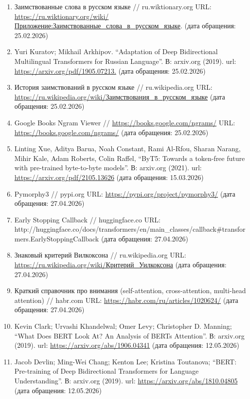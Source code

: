 \begin{enumerate}
\item
  Заимствованные слова в русском языке // ru.wiktionary.org URL: \href{https://ru.wiktionary.org/wiki/Приложение:Заимствованные_слова_в_русском_языке}{https://ru.wiktionary.org/wiki/Приложение:Заимствованные\_слова\_в\_русском\_языке}. (дата обращения: 25.02.2026)
\item
  Yuri Kuratov; Mikhail Arkhipov. ``Adaptation of Deep Bidirectional Multilingual Transformers for Russian Language''. В: arxiv.org (2019). url: \url{https://arxiv.org/pdf/1905.07213.} (дата обращения: 25.02.2026)
\item
  История заимствований в русском языке // ru.wikipedia.org URL: \href{https://ru.wikipedia.org/wiki/Заимствования_в_русском_языке}{https://ru.wikipedia.org/wiki/Заимствования\_в\_русском\_языке} (дата обращения: 25.02.2026)
\item
  Google Books Ngram Viewer // \url{https://books.google.com/ngrams/} URL: \url{https://books.google.com/ngrams/} (дата обращения: 25.02.2026)
\item
  Linting Xue, Aditya Barua, Noah Constant, Rami Al-Rfou, Sharan Narang, Mihir Kale, Adam Roberts, Colin Raffel, ``ByT5: Towards a token-free future with pre-trained byte-to-byte models''. В: arxiv.org (2021). url: \url{https://arxiv.org/pdf/2105.13626} (дата обращения: 15.03.2026)
\item
  Pymorphy3 // pypi.org URL: \url{https://pypi.org/project/pymorphy3/} (дата обращения: 27.04.2026)
\item
  Early Stopping Callback // huggingface.co URL: http://huggingface.co/docs/transformers/en/main\_classes/callback\#transformers.EarlyStoppingCallback (дата обращения: 27.04.2026)
\item
  Знаковый критерий Вилкоксона // ru.wikipedia.org URL: \href{https://ru.wikipedia.org/wiki/Критерий_Уилкоксона}{https://ru.wikipedia.org/wiki/Критерий\_Уилкоксона} (дата обращения: 27.04.2026)
\item
  Краткий справочник про внимания (self-attention, cross-attention, multi-head attention) // habr.com URL: \url{https://habr.com/ru/articles/1020624/} (дата обращения: 27.04.2026)
\item
  Kevin Clark; Urvashi Khandelwal; Omer Levy; Christopher D. Manning; ``What Does BERT Look At? An Analysis of BERT\textquotesingle s Attention''. В: arxiv.org (2019). url: \url{https://arxiv.org/abs/1906.04341} (дата обращения: 12.05.2026)
\item
  Jacob Devlin; Ming-Wei Chang; Kenton Lee; Kristina Toutanova; ``BERT: Pre-training of Deep Bidirectional Transformers for Language Understanding''. В: arxiv.org (2019). url: \url{https://arxiv.org/abs/1810.04805} (дата обращения: 12.05.2026)
\end{enumerate}

